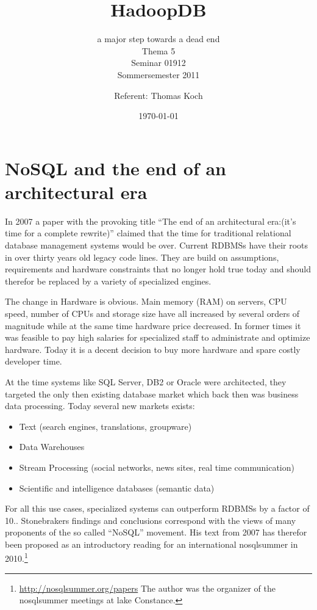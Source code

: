 \documentclass[12pt,a4paper]{scrartcl}		%
\begin{document}
\title{HadoopDB}
\subtitle{a major step towards a dead end\\
Thema 5\\Seminar 01912\\ Sommersemester 2011}
\author{Referent: Thomas Koch}
\date{\today}
\maketitle{}

\newpage{}
\tableofcontents{}
\newpage{}

\section{NoSQL and the end of an architectural era}
In 2007 a paper with the provoking title ``The end of an architectural era:(it's time for a complete rewrite)''\cite{sto07} claimed that the time for traditional relational database management systems would be over. Current RDBMSs have their roots in over thirty years old legacy code lines. They are build on assumptions, requirements and hardware constraints that no longer hold true today and should therefor be replaced by a variety of specialized engines.

The change in Hardware is obvious. Main memory (RAM) on servers, CPU speed, number of CPUs and storage size have all increased by several orders of magnitude while at the same time hardware price decreased. In former times it was feasible to pay high salaries for specialized staff to administrate and optimize hardware. Today it is a decent decision to buy more hardware and spare costly developer time.

At the time systems like SQL Server, DB2 or Oracle were architected, they targeted the only then existing database market which back then was business data processing. Today several new markets exists:

\begin{itemize}
\item Text (search engines, translations, groupware)
\item Data Warehouses
\item Stream Processing (social networks, news sites, real time communication)
\item Scientific and intelligence databases (semantic data)
\end{itemize}

For all this use cases, specialized systems can outperform RDBMSs by a factor of 10.\cite{conf/cidr/StonebrakerBCCGHHLRZ07}. Stonebrakers findings and conclusions correspond with the views of many proponents of the so called ``NoSQL'' movement. His text from 2007 has therefor been proposed as an introductory reading for an international nosqlsummer in 2010.\footnote{\url{http://nosqlsummer.org/papers} The author was the organizer of the nosqlsummer meetings at lake Constance.} 
\end{document}

